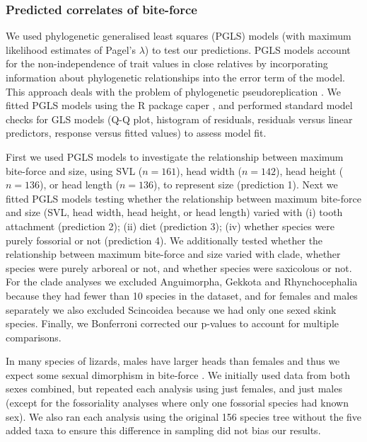\documentclass[a4paper, 12pt]{article}
\begin{document}
\subsubsection{Predicted correlates of bite-force}
We used phylogenetic generalised least squares (PGLS) models (with maximum likelihood estimates of Pagel’s $\lambda$) to test our predictions.
PGLS models account for the non-independence of trait values in close relatives by incorporating information about phylogenetic relationships into the error term of the model. 
This approach deals with the problem of phylogenetic pseudoreplication \cite{harvey1991comparative}. 
We fitted PGLS models using the R package caper \cite{orme2018caper}, and performed standard model checks for GLS models (Q-Q plot, histogram of residuals, residuals versus linear predictors, response versus fitted values) to assess model fit. 

First we used PGLS models to investigate the relationship between maximum bite-force and size, using SVL ($n = 161$), head width ($n = 142$), head height ($n = 136$), or head length ($n = 136$), to represent size (prediction 1). 
Next we fitted PGLS models testing whether the relationship between maximum bite-force and size (SVL, head width, head height, or head length) varied with (i) tooth attachment (prediction 2); (ii) diet (prediction 3);  (iv) whether species were purely fossorial or not (prediction 4).
We additionally tested whether the relationship between maximum bite-force and size varied with clade, whether species were purely arboreal or not, and whether species were saxicolous or not. 
For the clade analyses we excluded Anguimorpha, Gekkota and Rhynchocephalia because they had fewer than 10 species in the dataset, and for females and males separately we also excluded Scincoidea because we had only one sexed skink species. 
Finally, we Bonferroni corrected our p-values to account for multiple comparisons.

In many species of lizards, males have larger heads than females and thus we expect some sexual dimorphism in bite-force \cite{herrel1999sexual,verwaijen2002relationships}. 
We initially used data from both sexes combined, but repeated each analysis using just females, and just males (except for the fossoriality analyses where only one fossorial species had known sex). 
We also ran each analysis using the original 156 species tree without the five added taxa to ensure this difference in sampling did not bias our results. 

\end{document}
